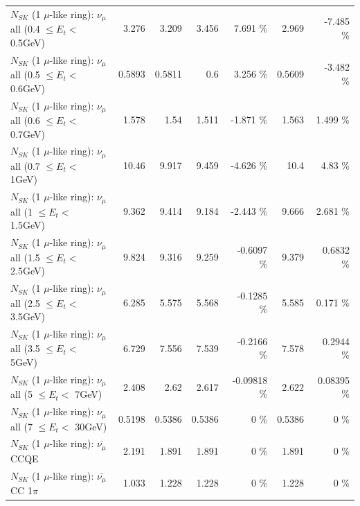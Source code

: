 \begin{table}
\begin{tabular}{| l | r | r | r  r | r  r |}
       $N_{SK}$ (1 $\mu$-like ring): $\nu_{\mu}$ all (0.4 $\leq E_{t} <$ 0.5GeV) &           3.276 &           3.209 &           3.456 &    7.691 \%  &           2.969 &   -7.485 \%  \\ 
       $N_{SK}$ (1 $\mu$-like ring): $\nu_{\mu}$ all (0.5 $\leq E_{t} <$ 0.6GeV) &          0.5893 &          0.5811 &             0.6 &    3.256 \%  &          0.5609 &   -3.482 \%  \\ 
       $N_{SK}$ (1 $\mu$-like ring): $\nu_{\mu}$ all (0.6 $\leq E_{t} <$ 0.7GeV) &           1.578 &            1.54 &           1.511 &   -1.871 \%  &           1.563 &    1.499 \%  \\ 
         $N_{SK}$ (1 $\mu$-like ring): $\nu_{\mu}$ all (0.7 $\leq E_{t} <$ 1GeV) &           10.46 &           9.917 &           9.459 &   -4.626 \%  &            10.4 &     4.83 \%  \\ 
         $N_{SK}$ (1 $\mu$-like ring): $\nu_{\mu}$ all (1 $\leq E_{t} <$ 1.5GeV) &           9.362 &           9.414 &           9.184 &   -2.443 \%  &           9.666 &    2.681 \%  \\ 
       $N_{SK}$ (1 $\mu$-like ring): $\nu_{\mu}$ all (1.5 $\leq E_{t} <$ 2.5GeV) &           9.824 &           9.316 &           9.259 &  -0.6097 \%  &           9.379 &   0.6832 \%  \\ 
       $N_{SK}$ (1 $\mu$-like ring): $\nu_{\mu}$ all (2.5 $\leq E_{t} <$ 3.5GeV) &           6.285 &           5.575 &           5.568 &  -0.1285 \%  &           5.585 &    0.171 \%  \\ 
         $N_{SK}$ (1 $\mu$-like ring): $\nu_{\mu}$ all (3.5 $\leq E_{t} <$ 5GeV) &           6.729 &           7.556 &           7.539 &  -0.2166 \%  &           7.578 &   0.2944 \%  \\ 
           $N_{SK}$ (1 $\mu$-like ring): $\nu_{\mu}$ all (5 $\leq E_{t} <$ 7GeV) &           2.408 &            2.62 &           2.617 & -0.09818 \%  &           2.622 &  0.08395 \%  \\ 
          $N_{SK}$ (1 $\mu$-like ring): $\nu_{\mu}$ all (7 $\leq E_{t} <$ 30GeV) &          0.5198 &          0.5386 &          0.5386 &        0 \%  &          0.5386 &        0 \%  \\ 
\hline
\hline
\hline
                              $N_{SK}$ (1 $\mu$-like ring): $\bar{\nu_\mu}$ CCQE &           2.191 &           1.891 &           1.891 &        0 \%  &           1.891 &        0 \%  \\ 
                         $N_{SK}$ (1 $\mu$-like ring): $\bar{\nu_\mu}$ CC 1$\pi$ &           1.033 &           1.228 &           1.228 &        0 \%  &           1.228 &        0 \%  \\ 

\end{tabular}
\end{table}
